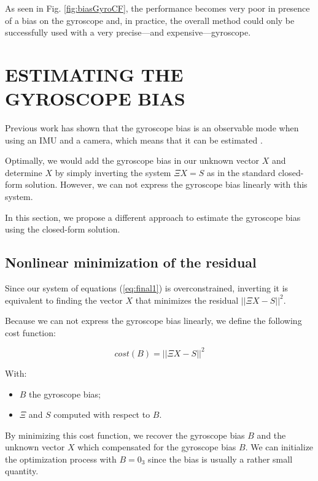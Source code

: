 \documentclass[letterpaper, 10 pt, conference]{ieeeconf}  %
\begin{document}
As seen in Fig. \ref{fig:biasGyroCF}, the performance becomes very poor in presence of a bias on the gyroscope and, in practice, the overall method could only be successfully used with a very precise---and expensive---gyroscope.



\section{ESTIMATING THE GYROSCOPE BIAS}

Previous work has shown that the gyroscope bias is an observable mode when using an IMU and a camera, which means that it can be estimated \cite{Martinelli2012}.

Optimally, we would add the gyroscope bias in our unknown vector $X$ and determine $X$ by simply inverting the system $\Xi X = S$ as in the standard closed-form solution.
However, we can not express the gyroscope bias linearly with this system.

In this section, we propose a different approach to estimate the gyroscope bias using the closed-form solution.

\subsection{Nonlinear minimization of the residual}

Since our system of equations (\ref{eq:final1}) is overconstrained,
inverting it is equivalent to finding the vector $X$ that minimizes the residual $||\Xi X - S||^2$.

Because we can not express the gyroscope bias linearly,
we define the following cost function:

\begin{equation}
  \label{eq:cost}
  cost(B) = ||\Xi X - S||^2
\end{equation}

With:
\begin{itemize}
\item $B$ the gyroscope bias;
\item $\Xi$ and $S$ computed with respect to $B$.
\end{itemize}

By minimizing this cost function, we recover the gyroscope bias $B$ and the unknown vector $X$ which compensated for the gyroscope bias $B$.
We can initialize the optimization process with $B = 0_3$ since the bias is usually a rather small quantity.
\end{document}
